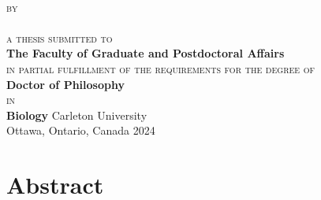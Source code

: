 \begin{titlepage}
  \thispagestyle{empty}
  \centering
  \vspace*{\fill}
  {\LARGE \textbf{\expandafter{\thesistitleI}}}\\[2mm]
  \vfill
  {\scshape by}\\
  {\large \expandafter{\myname}}\\
  \vfill
  {\scshape a thesis submitted to}\\
  \textbf{The Faculty of Graduate and Postdoctoral Affairs}\\
  {\scshape in partial fulfillment of the requirements for the degree of}\\
  \textbf{Doctor of Philosophy}\\
  {\scshape in}\\
  \textbf{Biology}
  \vfill
  {\large Carleton University}\\
  {\large Ottawa, Ontario, Canada}
  \vfill
  {\large \textcopyright{} 2024}\\
  {\large \expandafter{\myname}}
\end{titlepage}

\clearpage

\setcounter{page}{2}

\chapter*{Abstract}



